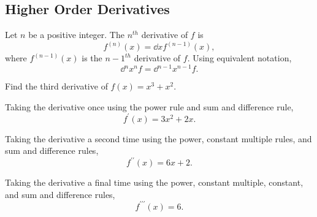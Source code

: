 \subsection{Higher Order Derivatives}
\begin{definition}
	Let $n$ be a positive integer. The $n^{th}$ derivative of $f$ is
	\begin{equation*}
		f^{(n)}(x) = \dd{}{x}{f^{(n-1)}}(x),
	\end{equation*}
	where $f^{(n-1)}(x)$ is the ${n-1}^{th}$ derivative of $f$.
	Using equivalent notation,
	\begin{equation*}
		\dd{{}^n}{x^n}f = \dd{{}^{n-1}}{x^{n-1}}f.
	\end{equation*}
\end{definition}

\begin{example}
	Find the third derivative of $f(x) = x^3 + x^2$.
\end{example}
\begin{answer}
	Taking the derivative once using the power rule and sum and difference rule,
	\begin{equation*}
		f^\prime(x) = 3x^2 + 2x.
	\end{equation*}
	
	Taking the derivative a second time using the power, constant multiple rules, and sum and difference rules,
	\begin{equation*}
		f^{\prime\prime}(x) = 6x + 2.
	\end{equation*}
	
	Taking the derivative a final time using the power, constant multiple, constant, and sum and difference rules,
	\begin{equation*}
		f^{\prime\prime\prime}(x) = 6.
	\end{equation*}
\end{answer}